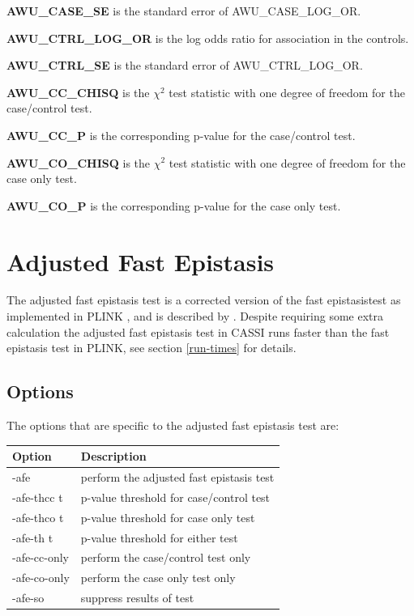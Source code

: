 \documentclass[a4paper,12pt]{article}
\begin{document}
{\bf AWU\_CASE\_SE} is the standard error of AWU\_CASE\_LOG\_OR.

{\bf AWU\_CTRL\_LOG\_OR} is the log odds ratio for association in the controls. 

{\bf AWU\_CTRL\_SE} is the standard error of AWU\_CTRL\_LOG\_OR.

{\bf AWU\_CC\_CHISQ} is the $\chi^2$ test statistic with one degree of freedom for the case/control test. 

{\bf AWU\_CC\_P} is the corresponding p-value for the case/control test. 

{\bf AWU\_CO\_CHISQ} is the $\chi^2$ test statistic with one degree of freedom for the case only test. 

{\bf AWU\_CO\_P} is the corresponding p-value for the case only test. 




\section{Adjusted Fast Epistasis}
\label{adjusted-fast-epistasis}

The adjusted fast epistasis test is a corrected version of the fast epistasistest as implemented in PLINK \citet{purcell:etal:07}, and is described by \citet{ueki:etal:12}. Despite requiring some extra calculation the adjusted fast epistasis test in CASSI runs faster than the fast epistasis test in PLINK, see  section \ref{run-times} for details. 
\subsection{Options}
\label{afe-options}

The options that are specific to the adjusted fast epistasis test are: 

{\begin{center}\begin{tabular}{ll}
Option  & Description\\
\hline
-afe  & perform the adjusted fast epistasis test\\
-afe-thcc t  & p-value threshold for case/control test\\
-afe-thco t  & p-value threshold for case only test\\
-afe-th t  & p-value threshold for either test\\
-afe-cc-only  & perform the case/control test only\\
-afe-co-only  & perform the case only test only\\
-afe-so  & suppress results of test\\
\end{tabular}\end{center}}
\end{document}
